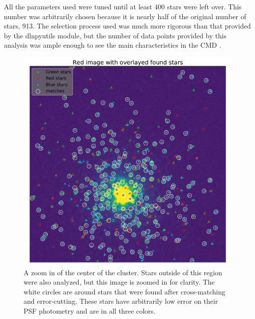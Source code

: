 \documentclass[twoside,11pt]{article}
\begin{document}
All the parameters used were tuned until at least 400 stars were left over. This number was arbitrarily chosen because it is nearly half of the original number of stars, 913. The selection process used was much more rigorous than that provided by the dlnpyutils module, but the number of data points provided by this analysis was ample enough to see the main characteristics in the CMD \citep{dlnpyutils}. 

\begin{figure}[ht]
\centering
\includegraphics[width=.75\textwidth]{stars.pdf}
\caption{A zoom in of the center of the cluster. Stars outside of this region were also analyzed, but this image is zoomed in for clarity. The white circles are around stars that were found after cross-matching and error-cutting. These stars have arbitrarily low error on their PSF photometry and are in all three colors.}
\label{fig:stars}
\end{figure}
\end{document}

